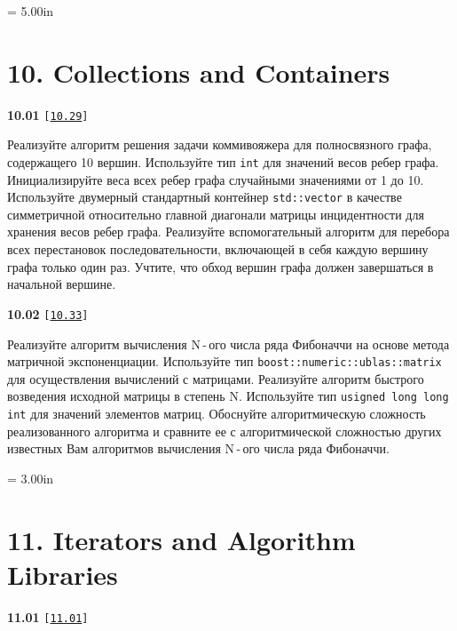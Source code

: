 \documentclass[a4paper,12pt]{article}
\begin{document}
\newpage\thispagestyle{empty}\pdfpageheight = 5.00in\enlargethispage{100in}

\section{10. Collections and Containers}

{\large \textbf{10.01} \texttt{[\href{https://github.com/i-s-m-mipt/Education/blob/master/projects/examples/source/10.29.cpp}{\texttt{10.29}}]}}

\bigskip

Реализуйте алгоритм решения задачи коммивояжера для полносвязного графа, содержащего 10 вершин. Используйте тип \lstinline{int} для значений весов ребер графа. Инициализируйте веса всех ребер графа случайными значениями от 1 до 10. Используйте двумерный стандартный контейнер \lstinline{std::vector} в качестве симметричной относительно главной диагонали матрицы инцидентности для хранения весов ребер графа. Реализуйте вспомогательный алгоритм для перебора всех перестановок последовательности, включающей в себя каждую вершину графа только один раз. Учтите, что обход вершин графа должен завершаться в начальной вершине.

\bigskip

{\large \textbf{10.02} \texttt{[\href{https://github.com/i-s-m-mipt/Education/blob/master/projects/examples/source/10.33.cpp}{\texttt{10.33}}]}}

\bigskip

Реализуйте алгоритм вычисления N\,-\,ого числа ряда Фибоначчи на основе метода матричной экспоненциации. Используйте тип \lstinline{boost::numeric::ublas::matrix} для осуществления вычислений с матрицами. Реализуйте алгоритм быстрого возведения исходной матрицы в степень N. Используйте тип \lstinline{usigned long long int} для значений элементов матриц. Обоснуйте алгоритмическую сложность реализованного алгоритма и сравните ее с алгоритмической сложностью других известных Вам алгоритмов вычисления N\,-\,ого числа ряда Фибоначчи.



\newpage\thispagestyle{empty}\pdfpageheight = 3.00in\enlargethispage{100in}

\section{11. Iterators and Algorithm Libraries}

{\large \textbf{11.01} \texttt{[\href{https://github.com/i-s-m-mipt/Education/blob/master/projects/examples/source/11.01.cpp}{\texttt{11.01}}]}}
\end{document}
